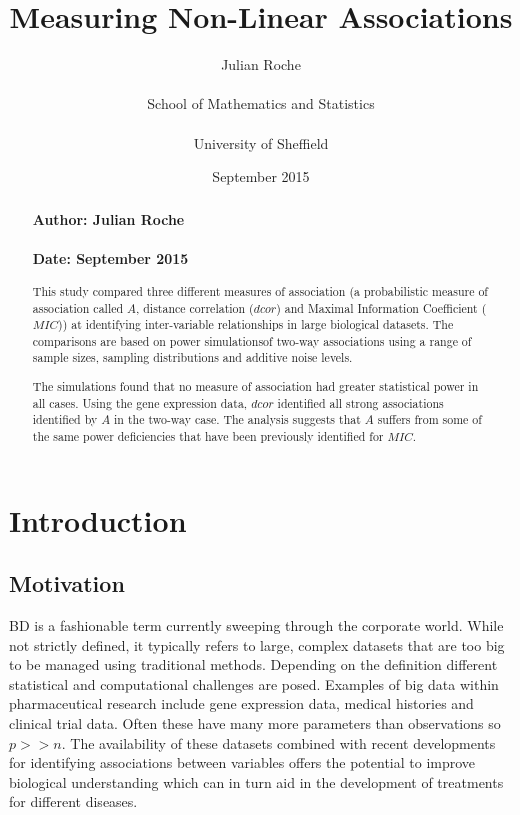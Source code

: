 \documentclass[a4paper, 12pt]{report}
\title{Measuring Non-Linear Associations}
\author{Julian Roche  \\  \\ School of Mathematics and Statistics \\ \\ University of Sheffield}
\date{September 2015}
\begin{document}
\pagestyle{myheadings}

\maketitle


\begin{abstract}
\subsubsection*{Author: Julian Roche}
\subsubsection*{Date: September 2015}


This study compared three different measures of association (a probabilistic measure of association called $A$, distance correlation ($dcor$) and Maximal Information Coefficient ($MIC$)) at identifying inter-variable relationships in large biological datasets. The comparisons are based on power simulationsof two-way associations using a range of sample sizes, sampling distributions and additive noise levels.

The simulations found that no measure of association had greater statistical power in all cases. Using the gene expression data, $dcor$ identified all strong associations identified by $A$ in the two-way case. The analysis suggests that $A$ suffers from some of the same power deficiencies that have been previously identified for $MIC$.  

\end{abstract}

\newpage

\tableofcontents{}
 
\chapter{Introduction}

\section{Motivation}
\gls{BD} is a fashionable term currently sweeping through the corporate world. While not strictly defined, it typically refers to large, complex datasets that are too big to be managed using traditional methods. Depending on the definition different statistical and computational challenges are posed. Examples of big data within pharmaceutical research include gene expression data, medical histories and clinical trial data. Often these have many more parameters than observations so $p >> n$. The availability of these datasets combined with recent developments for identifying associations between variables offers the potential to improve biological understanding which can in turn aid in the development of treatments for different diseases. 
\end{document}
